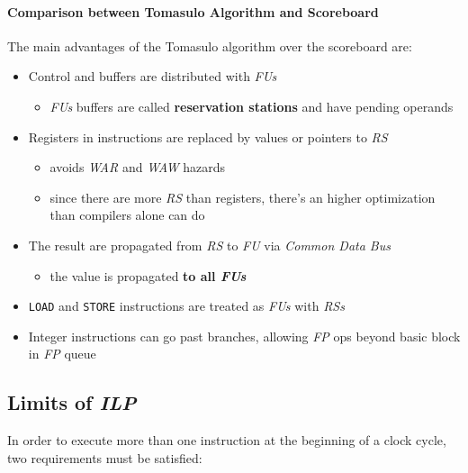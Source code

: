\documentclass[english]{article}
\begin{document}
\paragraph{Comparison between Tomasulo Algorithm and Scoreboard}

The main advantages of the Tomasulo algorithm over the scoreboard are:
\begin{itemize}
  \item Control and buffers are distributed with \textit{FUs}
        \begin{itemize}
          \item \textit{FUs} buffers are called \textbf{reservation stations} and have pending operands
        \end{itemize}
  \item Registers in instructions are replaced by values or pointers to \textit{RS}
        \begin{itemize}
          \item avoids \textit{WAR} and \textit{WAW} hazards
          \item since there are more \textit{RS} than registers, there's an higher optimization than compilers alone can do
        \end{itemize}
  \item The result are propagated from \textit{RS} to \textit{FU} via \textit{Common Data Bus}
        \begin{itemize}
          \item the value is propagated \textbf{to all \textit{FUs}}
        \end{itemize}
  \item \texttt{LOAD} and \texttt{STORE} instructions are treated as \textit{FUs} with \textit{RSs}
  \item Integer instructions can go past branches, allowing \textit{FP} ops beyond basic block in \textit{FP} queue
\end{itemize}

\subsection{Limits of \textit{ILP}}

In order to execute more than one instruction at the beginning of a clock cycle, two requirements must be satisfied:
\end{document}
